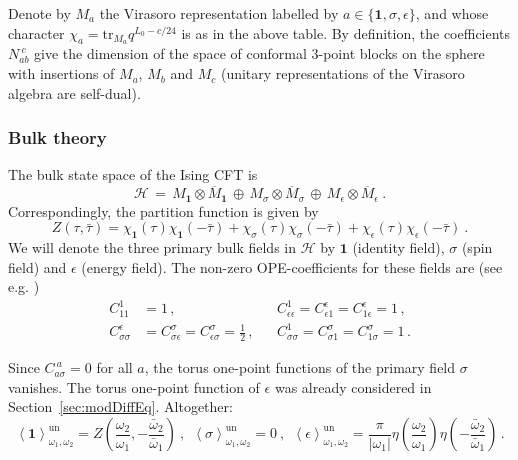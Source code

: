 \documentclass[11pt,a4paper]{article}
\numberwithin{equation}{section}
\newcommand{\one}{\mathbf{1}} %
\begin{document}
Denote by $M_a$ the Virasoro representation labelled by $a \in \{\one,\sigma,\epsilon\}$, and whose character $\chi_a = \mathrm{tr}_{M_a} q^{L_0 - c/24}$ is as in the above table. By definition, the coefficients $N_{ab}^{~c}$ give the dimension of the space of conformal 3-point blocks on the sphere with insertions of $M_a$, $M_b$ and $M_c$ (unitary representations of the Virasoro algebra are self-dual).

\subsubsection*{Bulk theory}

The bulk state space of the Ising CFT is
\begin{equation}
	\mathcal{H} 
	\,=\, 
	M_\one \otimes \overline M_\one 
	\,\oplus\,
	M_\sigma \otimes \overline M_\sigma
	\,\oplus\,
	M_\epsilon \otimes \overline M_\epsilon
	~.
\end{equation}
Correspondingly, the partition function is given by
%
\begin{equation}\label{eq:IsingPatition}
	Z(\tau,\bar{\tau}) 
	= \chi_\one(\tau) \chi_\one(-\bar{\tau}) + \chi_{\sigma}(\tau) \chi_{\sigma}(-\bar{\tau}) + \chi_{\epsilon}(\tau) \chi_{\epsilon}(-\bar{\tau})~.
\end{equation}
We will denote the three primary bulk fields in $\mathcal{H}$ by $\one$ (identity field), $\sigma$ (spin field) and $\epsilon$ (energy field). The non-zero OPE-coefficients for these fields are (see e.g. \cite[Sec.\,12.3.3]{DiFrancesco:1997nk})
%
\begin{align}
	C_{11}^1 &= 1\,, &&C_{\epsilon\epsilon}^1 = C_{\epsilon 1}^\epsilon = C_{1\epsilon}^\epsilon = 1\,,
	\nonumber\\
	C_{\sigma\sigma}^\epsilon &= C_{\sigma\epsilon}^\sigma = C_{\epsilon\sigma}^\sigma = \frac{1}{2}\,, &&C_{\sigma\sigma}^1 = C_{\sigma 1}^\sigma = C_{1\sigma}^\sigma = 1\,.\label{eq:IsingOPEbulk}
\end{align}

\noindent
Since $C_{a\sigma}^{~a}=0$ for all $a$, the torus one-point functions of the primary field $\sigma$ vanishes. The torus one-point function of $\epsilon$ 
was already considered in Section~\ref{sec:modDiffEq}. Altogether: 
%
\begin{equation}\label{eq:IsingEps}
	\left\langle \one \right\rangle^\mathrm{un}_{\omega_1,\omega_2} = Z\!\left(\frac{\omega_2}{\omega_1},-\frac{\bar{\omega}_2}{\bar{\omega}_1}\right) 
~,~~
	\left\langle \sigma \right\rangle^\mathrm{un}_{\omega_1,\omega_2} = 0 
~,~~
	\left\langle \epsilon \right\rangle^\mathrm{un}_{\omega_1,\omega_2} = \frac{\pi}{|\omega_1|} \eta\!\left(\frac{\omega_2}{\omega_1}\right) \eta\!\left(-\frac{\bar{\omega}_2}{\bar{\omega}_1}\right) \,.
\end{equation}
\end{document}
